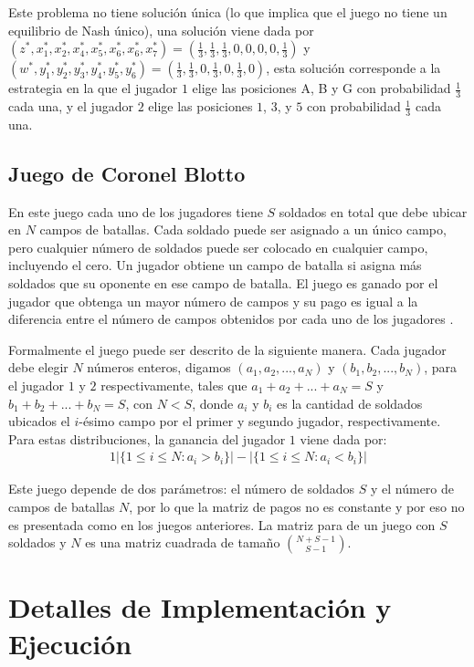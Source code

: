 Este problema no tiene solución única (lo que implica que el juego no tiene un equilibrio de Nash único), una solución viene dada por $(z^*, x^*_1, x^*_2, x^*_4, x^*_5, x^*_6, x^*_6, x^*_7) = (\frac{1}{3}, \frac{1}{3}, \frac{1}{3}, 0, 0, 0, 0, \frac{1}{3})$ y $(w^*, y^*_1, y^*_2, y^*_3,  y^*_4, y^*_5, y^*_6) = (\frac{1}{3}, \frac{1}{3}, 0, \frac{1}{3}, 0, \frac{1}{3}, 0)$, esta solución corresponde a la estrategia en la que el jugador $1$ elige las posiciones A, B y G con probabilidad $\frac{1}{3}$ cada una, y el jugador $2$ elige las posiciones $1$, $3$, y $5$ con probabilidad $\frac{1}{3}$ cada una.

\subsection*{Juego de Coronel Blotto}

En este juego cada uno de los jugadores tiene $S$ soldados en total que debe ubicar en $N$ campos de batallas. Cada soldado puede ser asignado a un único campo, pero cualquier número de soldados puede ser colocado en cualquier campo, incluyendo el cero. Un jugador obtiene un campo de batalla si asigna más soldados que su oponente en ese campo de batalla. El juego es ganado por el jugador que obtenga un mayor número de campos y su pago es igual a la diferencia entre el número de campos obtenidos por cada uno de los jugadores \cite{bib:blotto-game}.

Formalmente el juego puede ser descrito de la siguiente manera. Cada jugador debe elegir $N$ números enteros, digamos $(a_1, a_2, ..., a_N)$ y $(b_1, b_2, ..., b_N)$, para el jugador $1$ y $2$ respectivamente, tales que $a_1 + a_2 + ... + a_N = S$ y $b_1 + b_2 + ... + b_N = S$, con $N < S$, donde $a_i$ y $b_i$ es la cantidad de soldados ubicados el $i$-ésimo campo por el primer y segundo jugador, respectivamente. Para estas distribuciones, la ganancia del jugador $1$ viene dada por:
\begin{alignat}{1}
|\{ 1 \leq i \leq N : a_i > b_i\}| - |\{ 1 \leq i \leq N : a_i < b_i\}|
\end{alignat}

Este juego depende de dos parámetros: el número de soldados $S$ y el número de campos de batallas $N$, por lo que la matriz de pagos no es constante y por eso no es presentada como en los juegos anteriores. La matriz para de un juego con $S$ soldados y $N$ es una matriz cuadrada de tamaño $\binom{N+S-1}{S-1}$.

\section{Detalles de Implementación y Ejecución}


